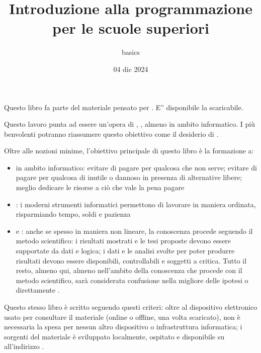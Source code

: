 \documentclass[letterpaper,10pt,italian]{jupyterBook}
\title{Introduzione alla programmazione per le scuole superiori}
\date{04 dic 2024}
\author{basics}
\begin{document}
\pagestyle{empty}
\sphinxmaketitle
\pagestyle{plain}
\sphinxtableofcontents
\pagestyle{normal}
\label{\detokenize{intro::doc}}


\sphinxAtStartPar
Questo libro fa parte del materiale pensato per . E” disponibile la  scaricabile.

\sphinxAtStartPar
{} Questo lavoro punta ad essere un’opera di  ,   , almeno in ambito informatico. I più benvolenti potranno riassumere questo obiettivo come il desiderio di .

\sphinxAtStartPar
Oltre alle nozioni minime, l’obiettivo principale di questo libro è la formazione a:
\begin{itemize}
\item {} 
\sphinxAtStartPar
{} in ambito informatico: evitare di pagare per qualcosa che non serve; evitare di pagare per qualcosa di inutile o dannoso in presenza di alternative libere; meglio dedicare le risorse a ciò che vale la pena pagare

\item {} 
\sphinxAtStartPar
{}: i moderni strumenti informatici permettono di lavorare in maniera ordinata, risparmiando tempo, soldi e pazienza

\item {} 
\sphinxAtStartPar
{} e : anche se spesso in maniera non lineare, la conoscenza procede seguendo il metodo scientifico: i risultati mostrati e le tesi proposte devono essere supportate da dati e logica; i dati e le analisi svolte per poter produrre risultati devono essere disponibili, controllabili e soggetti a critica. Tutto il resto, almeno qui, almeno nell’ambito della conoscenza che procede con il metodo scientifico, sarà considerata confusione nella migliore delle ipotesi o direttamente .

\end{itemize}

\sphinxAtStartPar
Questo stesso libro è scritto seguendo questi criteri: oltre al dispositivo elettronico usato per consultare il materiale (online o offline, una volta scaricato), non è necessaria la spesa per nessun altro dispositivo o infrastruttura informatica; i sorgenti del materiale è sviluppato localmente, ospitato e disponibile su  all’indirizzo .
\end{document}
